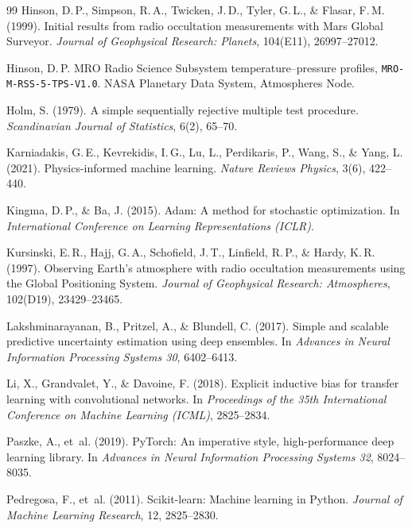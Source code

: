 \documentclass[11pt,a4paper]{article}
\begin{document}
\begin{thebibliography}{99}
Hinson, D.\,P., Simpson, R.\,A., Twicken, J.\,D., Tyler, G.\,L., \& Flasar, F.\,M. (1999). Initial results from radio occultation measurements with Mars Global Surveyor. \emph{Journal of Geophysical Research: Planets}, 104(E11), 26997--27012.

Hinson, D.\,P. MRO Radio Science Subsystem temperature--pressure profiles, \texttt{MRO-M-RSS-5-TPS-V1.0}. NASA Planetary Data System, Atmospheres Node.

Holm, S. (1979). A simple sequentially rejective multiple test procedure. \emph{Scandinavian Journal of Statistics}, 6(2), 65--70.

Karniadakis, G.\,E., Kevrekidis, I.\,G., Lu, L., Perdikaris, P., Wang, S., \& Yang, L. (2021). Physics-informed machine learning. \emph{Nature Reviews Physics}, 3(6), 422--440.

Kingma, D.\,P., \& Ba, J. (2015). Adam: A method for stochastic optimization. In \emph{International Conference on Learning Representations (ICLR)}.

Kursinski, E.\,R., Hajj, G.\,A., Schofield, J.\,T., Linfield, R.\,P., \& Hardy, K.\,R. (1997). Observing Earth's atmosphere with radio occultation measurements using the Global Positioning System. \emph{Journal of Geophysical Research: Atmospheres}, 102(D19), 23429--23465.

Lakshminarayanan, B., Pritzel, A., \& Blundell, C. (2017). Simple and scalable predictive uncertainty estimation using deep ensembles. In \emph{Advances in Neural Information Processing Systems 30}, 6402--6413.

Li, X., Grandvalet, Y., \& Davoine, F. (2018). Explicit inductive bias for transfer learning with convolutional networks. In \emph{Proceedings of the 35th International Conference on Machine Learning (ICML)}, 2825--2834.

Paszke, A., et~al. (2019). PyTorch: An imperative style, high-performance deep learning library. In \emph{Advances in Neural Information Processing Systems 32}, 8024--8035.

Pedregosa, F., et~al. (2011). Scikit-learn: Machine learning in Python. \emph{Journal of Machine Learning Research}, 12, 2825--2830.


\end{thebibliography}
\end{document}
